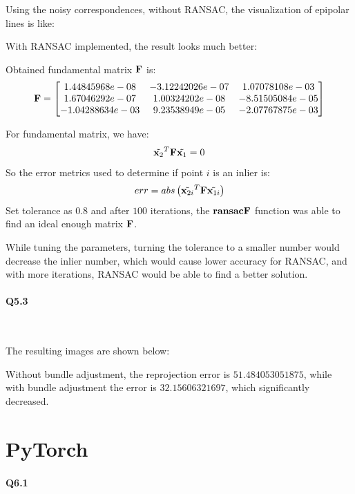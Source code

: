 \documentclass[11pt]{article} \usepackage{fullpage} \usepackage{graphicx} \usepackage{epstopdf} \usepackage{color} \usepackage{psfrag} \usepackage{pdfsync}\usepackage{indentfirst}\usepackage{subfigure}\usepackage{float}\usepackage[section]{placeins}
\begin{document}
Using the noisy correspondences, without RANSAC, the visualization of epipolar lines is like:


With RANSAC implemented, the result looks much better:

Obtained fundamental matrix $\bold{F}$ is:
\begin{equation}
	\bold{F} = \begin{bmatrix} 1.44845968e-08 & -3.12242026e-07 & 1.07078108e-03 \\
	1.67046292e-07 & 1.00324202e-08 & -8.51505084e-05 \\
	-1.04288634e-03 & 9.23538949e-05 & -2.07767875e-03
	\end{bmatrix}
\end{equation}

For fundamental matrix, we have:
\begin{equation}
	\tilde{\bold{x}_2}^T\bold{F}\tilde{\bold{x}_1} = 0
\end{equation}
So the error metrics used to determine if point $i$ is an inlier is:
\begin{equation}
	err = abs\left(\tilde{\bold{x}_{2i}}^T\bold{F}\tilde{\bold{x}_{1i}}\right)
\end{equation}
Set tolerance as $0.8$ and after $100$ iterations, the $\bold{ransacF}$ function was able to find an ideal enough matrix $\bold{F}$.

While tuning the parameters, turning the tolerance to a smaller number would decrease the inlier number, which would cause lower accuracy for RANSAC, and with more iterations, RANSAC would be able to find a better solution.

\paragraph{Q5.3}~{}

The resulting images are shown below:


Without bundle adjustment, the reprojection error is $51.484053051875$, while with bundle adjustment the error is $32.15606321697$, which significantly decreased.

\section{PyTorch}

\paragraph{Q6.1}~{}
\end{document}
